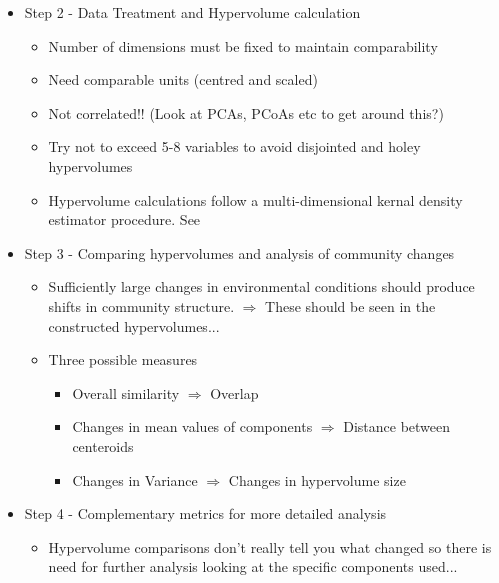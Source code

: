 \documentclass[11pt]{article}
\begin{document}
\begin{itemize}
\begin{itemize}
				\item Step 2 - Data Treatment and Hypervolume calculation
				\begin{itemize}
					\item Number of dimensions must be fixed to maintain comparability
					\item Need comparable units (centred and scaled)
					\item Not correlated!! (Look at PCAs, PCoAs etc to get around this?)
					\item Try not to exceed 5-8 variables to avoid disjointed and holey hypervolumes
					\item Hypervolume calculations follow a multi-dimensional kernal density estimator procedure. See \cite{Blonder2014}   
				\end{itemize}
				
				\item Step 3 - Comparing hypervolumes and analysis of community changes
				\begin{itemize}
					\item Sufficiently large changes in environmental conditions should produce shifts in community structure. $\Rightarrow$ These should be seen in the constructed hypervolumes...
					\item Three possible measures
					\begin{itemize}
						\item Overall similarity $\Rightarrow$ Overlap
						\item Changes in mean values of components $\Rightarrow$ Distance between centeroids
						\item Changes in Variance $\Rightarrow$ Changes in hypervolume size 
					\end{itemize}
				\end{itemize}
				
				\item Step 4 - Complementary metrics for more detailed analysis
				\begin{itemize}
					\item Hypervolume comparisons don't really tell you what changed so there is  need for further analysis looking at the specific components used...
				\end{itemize}
				 

\end{itemize}
\end{itemize}
\end{document}
